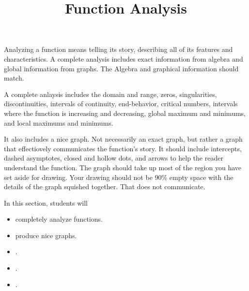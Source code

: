 \documentclass{ximera}
\title{Function Analysis}
\begin{document}
\begin{abstract}
\end{abstract}
\maketitle




Analyzing a function means telling its story, describing all of its features and characteristics.  A complete analysis includes exact information from algebra and global information from graphs.  The Algebra and graphical information should match.

A complete anlaysis includes the domain and range, zeros, singularities, discontinuities, intervals of continuity, end-behavior, critical numbers, intervals where the function is increasing and decreasing, global maximum and minimums, and local maximums and minimums.

It also includes a nice graph.  Not necessarily an exact graph, but rather a graph that effectiovely communicates the function's story. It should include intercepts, dashed asymptotes, closed and hollow dots, and arrows to help the reader understand the function.  The graph should take up most of the region you have set aside for drawing.  Your drawing should not be 90\% empty space with the details of the graph squished together.  That does not communicate.
























\begin{sectionOutcomes}
In this section, students will 

\begin{itemize}
\item completely analyze functions.
\item produce nice graphs.
\item .
\item .
\item .
\end{itemize}
\end{sectionOutcomes}
\end{document}
